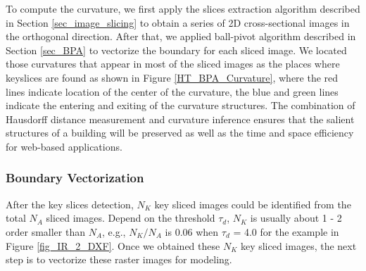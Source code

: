 \documentclass[12pt,letterpaper]{article}
\begin{document}
To compute the curvature, we first apply the slices extraction algorithm described in Section
\ref{sec_image_slicing}
to obtain a series of 2D cross-sectional images in the orthogonal direction. After that, we applied
ball-pivot algorithm described in Section \ref{sec_BPA} to vectorize the boundary for each
sliced image. We located those curvatures that appear in most of the sliced images as the
places where keyslices are found as shown in Figure \ref{HT_BPA_Curvature}, where the red lines
indicate location of the center of the curvature, the blue and green lines indicate the
entering and exiting of the curvature structures. The combination of Hausdorff distance measurement
and curvature inference ensures that the salient structures of a building will be
preserved as well as the time and space efficiency for web-based applications.

\subsubsection{Boundary Vectorization}
After the key slices detection, $N_K$ key sliced images could be identified from the total $N_A$ sliced images.
Depend on the threshold $\tau_{d}$, $N_K$ is usually about 1 - 2 order smaller than $N_A$,
e.g., $N_K/N_A$ is 0.06 when $\tau_d$ = 4.0 for the example in Figure \ref{fig_IR_2_DXF}.
 Once we obtained these $N_K$ key sliced images, the next step is to vectorize these raster images for modeling.
\end{document}
